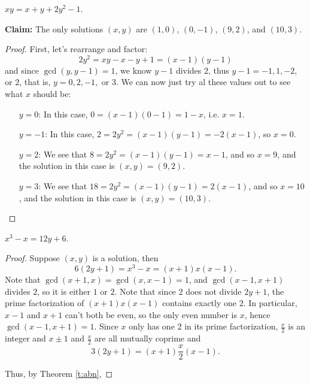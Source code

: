 \documentclass[11pt,dvipsnames]{book}
\numberwithin{equation}{section} %
\numberwithin{figure}{section} %
\numberwithin{table}{section} %
\begin{document}
\begin{exercise}
$xy= x+y+2y^2-1$.

\begin{solution}

{\bf Claim:} The only solutions $(x,y)$ are $(1,0)$, $(0,-1)$, $(9,2)$, and $(10,3)$.


\begin{proof}


First, let's rearrange and factor:
\[
2y^2=xy-x-y+1 = (x-1)(y-1)
\]
and since $\gcd(y,y-1)=1$, we know $y-1$ divides $2$, thus $y-1=-1,1,-2,$ or $2$, that is, $y=0,2,-1, $ or $3$. We can now just try al these values out to see what $x$ should be:
\begin{itemize}
\item[$y=0$:] In this case, $0=(x-1)(0-1)=1-x$, i.e. $x=1$.
\item[$y=-1$:] In this case, $2=2y^2=(x-1)(y-1)=-2(x-1)$, so $x=0$.
\item[$y=2$:] We see that $8=2y^2 = (x-1)(y-1)=x-1$, and so $x=9$, and the solution in this case is $(x,y)=(9,2)$. 
\item[$y=3$:] We see that $18=2y^2 = (x-1)(y-1)=2(x-1)$, and so $x=10$, and the solution in this case is $(x,y)=(10,3)$. 
\end{itemize}
\end{proof}
\end{solution}

\end{exercise}



\begin{exercise}
 $x^3-x=12y+6$. 

\begin{solution}



\begin{proof}
Suppose $(x,y)$ is a solution, then 
\[
6(2y+1) = x^3-x = (x+1)x(x-1).
\]
Note that $\gcd(x+1,x)=\gcd(x,x-1)=1$, and $\gcd(x-1,x+1)$ divides $2$, so it is either $1$ or $2$. Note that since $2$ does not divide $2y+1$, the prime factorization of $(x+1)x(x-1)$ contains exactly one $2$. In particular, $x-1$ and $x+1$ can't both be even, so the only even number is $x$, hence $\gcd(x-1,x+1)=1$. Since $x$ only has one 2 in its prime factorization, $\frac{x}{2}$ is an integer and $x\pm 1$ and $\frac{x}{2}$ are all mutually coprime and
\[
3(2y+1)=(x+1)\frac{x}{2}(x-1).
\]


Thus, by Theorem \ref{t:abn}, 


\end{proof}

\end{solution}

\end{exercise}
\end{document}
